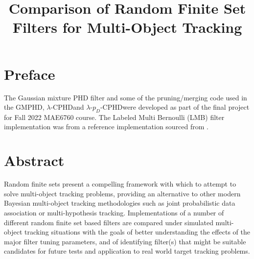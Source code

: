 \documentclass{article}
\title{Comparison of Random Finite Set Filters for Multi-Object Tracking}
\author{\name}
\newcommand{\lcphd}{$\lambda$-CPHD}
\newcommand{\lpdcphd}{$\lambda$-$p_D$-CPHD}
\begin{document}
\maketitle
\pagebreak


\section*{Preface}
The Gaussian mixture PHD filter and some of the pruning/merging code used in the GMPHD, \lcphd and \lpdcphd were developed as part of the final project for Fall 2022 MAE6760 course. The Labeled Multi Bernoulli (LMB) filter implementation was from a reference implementation sourced from \cite{vo_rfs}.

\section*{Abstract}
Random finite sets present a compelling framework with which to attempt to solve multi-object tracking problems, providing an alternative to other modern Bayesian multi-object tracking methodologies such as joint probabilistic data association or multi-hypothesis tracking. Implementations of a number of different random finite set based filters are compared under simulated multi-object tracking situations with the goals of better understanding the effects of the major filter tuning parameters, and of identifying filter(s) that might be suitable candidates for future tests and application to real world target tracking problems.

\tableofcontents
\listoffigures
\listoftables
\end{document}
